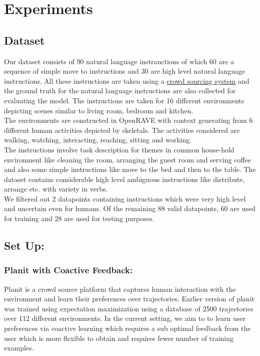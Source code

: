 \section{Experiments}
\subsection{Dataset}
Our dataset consists of 90 natural language instrauctions of which 60 are a sequence of simple move to instructions and 30 are high level natural language instructions. All these instructions are taken using a \href{http://52.25.65.189:9000/#/getFeedback}{crowd sourcing system} and the ground truth for the natural language instructions are also collected for evaluating the model. The instructions are taken for 16 different environments depicting scenes similar to living room, bedroom and kitchen. \\
The environments are constructed in OpenRAVE with context generating from 6 different human activities depicted by skeletals. The activities considered are walking, watching, interacting, reaching, sitting and working. \\
The instructions involve task description for themes in common house-hold enviromnent like cleaning the room, arranging the guest room and serving coffee and also some simple instructions like move to the bed and then to the table. The dataset contains considerable high level ambiguous instructions like distribute, arrange etc. with variety in verbs.\\
We filtered out 2 datapoints containing instructions which were very high level and uncertain even for  humans. Of the remaining 88 valid datapoints, 60 are used for training and 28 are used for testing purposes.  


\subsection{Set Up:}
	\subsubsection{Planit with Coactive Feedback:} 
		Planit is a crowd source platform that captures human interaction with the environment and learn their preferences over trajectories. Earlier version of planit was trained using expectation maximization using a database of 2500 trajectories over 112 different environments. In the current setting, we aim to to learn user preferences via coactive learning which requires a sub optimal feedback from the user which is more flexible to obtain and requires fewer number of training examples.

